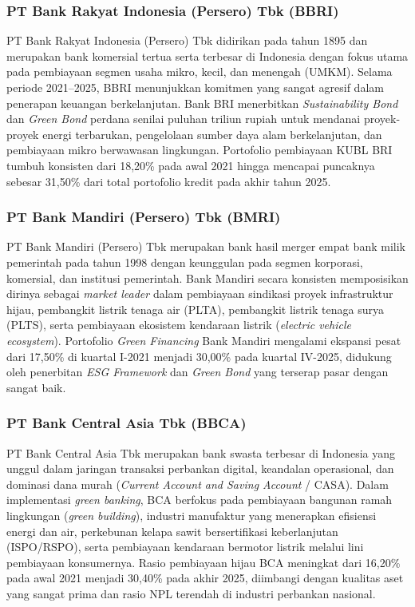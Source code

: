 \documentclass[12pt,a4paper]{article}
\numberwithin{equation}{section}
\begin{document}
\subsubsection{PT Bank Rakyat Indonesia (Persero) Tbk (BBRI)}
\noindent
PT Bank Rakyat Indonesia (Persero) Tbk didirikan pada tahun 1895 dan merupakan bank komersial tertua serta terbesar di Indonesia dengan fokus utama pada pembiayaan segmen usaha mikro, kecil, dan menengah (UMKM). Selama periode 2021--2025, BBRI menunjukkan komitmen yang sangat agresif dalam penerapan keuangan berkelanjutan. Bank BRI menerbitkan \emph{Sustainability Bond} dan \emph{Green Bond} perdana senilai puluhan triliun rupiah untuk mendanai proyek-proyek energi terbarukan, pengelolaan sumber daya alam berkelanjutan, dan pembiayaan mikro berwawasan lingkungan. Portofolio pembiayaan KUBL BRI tumbuh konsisten dari 18,20\% pada awal 2021 hingga mencapai puncaknya sebesar 31,50\% dari total portofolio kredit pada akhir tahun 2025.

\subsubsection{PT Bank Mandiri (Persero) Tbk (BMRI)}
\noindent
PT Bank Mandiri (Persero) Tbk merupakan bank hasil merger empat bank milik pemerintah pada tahun 1998 dengan keunggulan pada segmen korporasi, komersial, dan institusi pemerintah. Bank Mandiri secara konsisten memposisikan dirinya sebagai \emph{market leader} dalam pembiayaan sindikasi proyek infrastruktur hijau, pembangkit listrik tenaga air (PLTA), pembangkit listrik tenaga surya (PLTS), serta pembiayaan ekosistem kendaraan listrik (\emph{electric vehicle ecosystem}). Portofolio \emph{Green Financing} Bank Mandiri mengalami ekspansi pesat dari 17,50\% di kuartal I-2021 menjadi 30,00\% pada kuartal IV-2025, didukung oleh penerbitan \emph{ESG Framework} dan \emph{Green Bond} yang terserap pasar dengan sangat baik.

\subsubsection{PT Bank Central Asia Tbk (BBCA)}
\noindent
PT Bank Central Asia Tbk merupakan bank swasta terbesar di Indonesia yang unggul dalam jaringan transaksi perbankan digital, keandalan operasional, dan dominasi dana murah (\emph{Current Account and Saving Account} / CASA). Dalam implementasi \emph{green banking}, BCA berfokus pada pembiayaan bangunan ramah lingkungan (\emph{green building}), industri manufaktur yang menerapkan efisiensi energi dan air, perkebunan kelapa sawit bersertifikasi keberlanjutan (ISPO/RSPO), serta pembiayaan kendaraan bermotor listrik melalui lini pembiayaan konsumernya. Rasio pembiayaan hijau BCA meningkat dari 16,20\% pada awal 2021 menjadi 30,40\% pada akhir 2025, diimbangi dengan kualitas aset yang sangat prima dan rasio NPL terendah di industri perbankan nasional.
\end{document}
